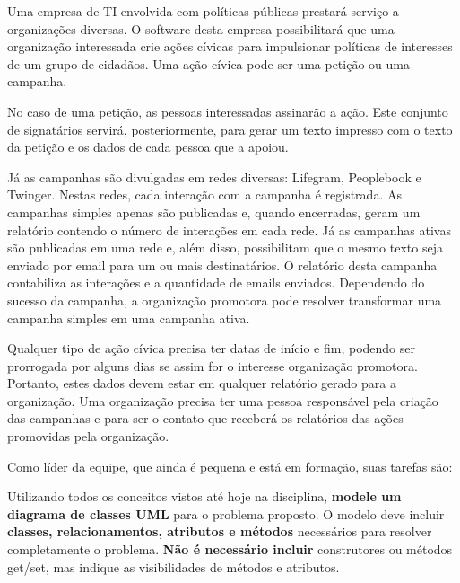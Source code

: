 \documentclass{lib/eng_softdoc}
\begin{document}
\makeheader

\problem Uma empresa de TI envolvida com políticas públicas prestará serviço a organizações diversas. O software desta empresa possibilitará que uma organização interessada crie ações cívicas para impulsionar políticas de interesses de um grupo de cidadãos. Uma ação cívica pode ser uma petição ou uma campanha.

No caso de uma petição, as pessoas interessadas assinarão a ação. Este conjunto de signatários servirá, posteriormente, para gerar um texto impresso com o texto da petição e os dados de cada pessoa que a apoiou. 

Já as campanhas são divulgadas em redes diversas: Lifegram, Peoplebook e Twinger. Nestas redes, cada interação com a campanha é registrada. As campanhas simples apenas são publicadas e, quando encerradas, geram um relatório contendo o número de interações em cada rede. Já as campanhas ativas são publicadas em uma rede e, além disso, possibilitam que o mesmo texto seja enviado por email para um ou mais destinatários. O relatório desta campanha contabiliza as interações e a quantidade de emails enviados. Dependendo do sucesso da campanha, a organização promotora pode resolver transformar uma campanha simples em uma campanha ativa. 

Qualquer tipo de ação cívica precisa ter datas de início e fim, podendo ser prorrogada por alguns dias se assim for o interesse organização promotora. Portanto, estes dados devem estar em qualquer relatório gerado para a organização. Uma organização precisa ter uma pessoa responsável pela criação das campanhas e para ser o contato que receberá os relatórios das ações promovidas pela organização.

Como líder da equipe, que ainda é pequena e está em formação, suas tarefas são:
 

\subproblem Utilizando todos os conceitos vistos até hoje na disciplina, \textbf{modele um diagrama de classes UML} para o problema proposto. O modelo deve incluir \textbf{classes, relacionamentos, atributos e métodos} necessários para resolver completamente o problema.
\textbf{Não é necessário incluir} construtores ou métodos get/set, mas indique as visibilidades de métodos e atributos. 
\end{document}
